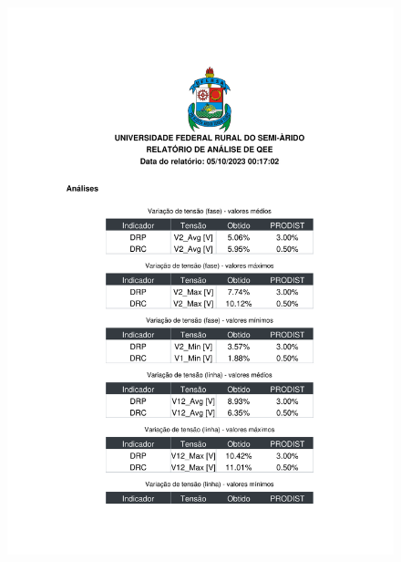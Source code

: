 \begin{figure}[H]
	\centering
  \includegraphics[height=20cm, page=2, clip]{contents/post_textual/analise_amostra_1.pdf}
\end{figure}

